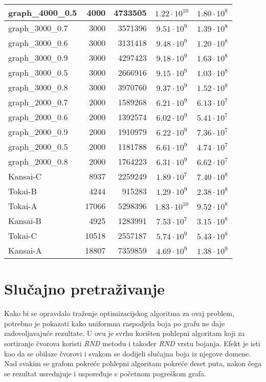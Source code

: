 \documentclass[times, utf8, diplomski, numeric]{fer}
\begin{document}
\begin{table}[htb]
\begin{tabular}{|l|r|r|c|c|}
		graph\_4000\_0.5 & 4000 & 4733505 & $1.22\cdot 10^{10}$ &$1.80\cdot 10^{8}$ \\ \hline 
		graph\_3000\_0.7 & 3000 & 3571396 & $9.51\cdot 10^{9}$ &$1.39\cdot 10^{8}$ \\ \hline 
		graph\_3000\_0.6 & 3000 & 3131418 & $9.48\cdot 10^{9}$ &$1.20\cdot 10^{8}$ \\ \hline 
		graph\_3000\_0.9 & 3000 & 4297423 & $9.18\cdot 10^{9}$ &$1.63\cdot 10^{8}$ \\ \hline 
		graph\_3000\_0.5 & 3000 & 2666916 & $9.15\cdot 10^{9}$ &$1.03\cdot 10^{8}$ \\ \hline 
		graph\_3000\_0.8 & 3000 & 3970760 & $9.37\cdot 10^{9}$ &$1.52\cdot 10^{8}$ \\ \hline 
		graph\_2000\_0.7 & 2000 & 1589268 & $6.21\cdot 10^{9}$ &$6.13\cdot 10^{7}$ \\ \hline 
		graph\_2000\_0.6 & 2000 & 1392574 & $6.02\cdot 10^{9}$ &$5.41\cdot 10^{7}$ \\ \hline 
		graph\_2000\_0.9 & 2000 & 1910979 & $6.22\cdot 10^{9}$ &$7.36\cdot 10^{7}$ \\ \hline 
		graph\_2000\_0.5 & 2000 & 1181788 & $6.61\cdot 10^{9}$ &$4.74\cdot 10^{7}$ \\ \hline 
		graph\_2000\_0.8 & 2000 & 1764223 & $6.31\cdot 10^{9}$ &$6.62\cdot 10^{7}$ \\ \hline 
		Kansai-C & 8937 & 2259249 & $1.89\cdot 10^{7}$ &$7.40\cdot 10^{8}$ \\ \hline 
		Tokai-B & 4244 & 915283 & $1.29\cdot 10^{9}$ &$2.38\cdot 10^{8}$ \\ \hline 
		Tokai-A & 17066 & 5298396 & $1.83\cdot 10^{10}$ &$9.52\cdot 10^{8}$ \\ \hline 
		Kansai-B & 4925 & 1283991 & $7.53\cdot 10^{7}$ &$3.15\cdot 10^{8}$ \\ \hline 
		Tokai-C & 10518 & 2557187 & $5.74\cdot 10^{9}$ &$5.43\cdot 10^{8}$ \\ \hline 
		Kansai-A & 18807 & 7359859 & $4.69\cdot 10^{9}$ &$1.38\cdot 10^{9}$ \\ \hline 
	\end{tabular}
\end{table}

\section{Slučajno pretraživanje}

Kako bi se opravdalo traženje optimizacijskog algoritma za ovaj problem, potrebno je pokazati kako uniformna raspodjela boja po grafu ne daje zadovoljavajuće rezultate. U ovu je svrhu korišten pohlepni algoritam koji za sortiranje čvorova koristi \emph{RND} metodu i također \emph{RND} vrstu bojanja. Efekt je isti kao da se obilaze čvorovi i svakom se dodijeli slučajna boja iz njegove domene. Nad svakim se grafom pokreće pohlepni algoritam pokreće deset puta, nakon čega se rezultat usrednjuje i uspoređuje s početnom pogreškom grafa.
\end{document}
